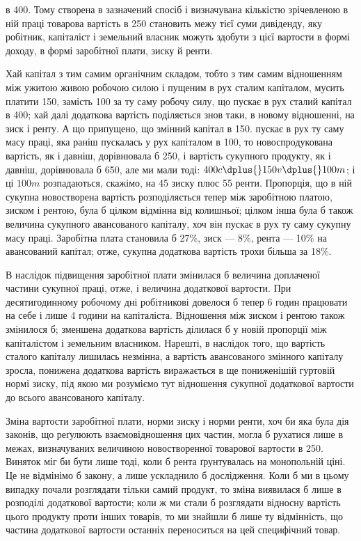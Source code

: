 \parcont{}  %
в 400. Тому створена в зазначений спосіб і визначувана кількістю зрічевленою
в ній праці товарова вартість в 250 становить межу тієї суми дивіденду,
яку робітник, капіталіст і земельний власник можуть здобути з цієї вартости
в формі доходу, в формі заробітної плати, зиску й ренти.

Хай капітал з тим самим органічним складом, тобто з тим самим відношенням
між ужитою живою робочою силою і пущеним в рух сталим капіталом,
мусить платити 150, замість 100 за ту саму робочу силу,
що пускає в рух сталий капітал в 400; хай далі додаткова вартість поділяється
знов таки, в новому відношенні, на зиск і ренту. А що припущено,
що змінний капітал в 150. пускає в рух ту саму масу праці,
яка раніш пускалась у рух капіталом в 100, то новоспродукована вартість, як
і давніш, дорівнювала б 250, і вартість сукупного продукту, як і давніш, дорівнювала
б 650, але ми мали тоді: $400c \dplus{} 150v \dplus{} 100m$; і ці $100m$ розпадаються,
скажімо, на 45 зиску плюс 55 ренти. Пропорція, що в ній сукупна новостворена
вартість розподіляється тепер між заробітною платою, зиском і рентою,
була б цілком відмінна від колишньої; цілком інша була б також величина
сукупного авансованого капіталу, хоч він пускає в рух ту саму сукупну масу
праці. Заробітна плата становила б 27\%, зиск — 8\%, рента — 10\% на
авансований капітал; отже, сукупна додаткова вартість трохи більша за 18\%.

В наслідок підвищення заробітної плати змінилася б величина доплаченої
частини сукупної праці, отже, і величина додаткової вартости. При десятигодинному
робочому дні робітникові довелося б тепер 6 годин працювати на
себе і лише 4 години на капіталіста. Відношення між зиском і рентою також
змінилося б; зменшена додаткова вартість ділилася б у новій пропорції між
капіталістом і земельним власником. Нарешті, в наслідок того, що вартість
сталого капіталу лишилась незмінна, а вартість авансованого змінного капіталу
зросла, понижена додаткова вартість виражається в ще пониженішій гуртовій
нормі зиску, під якою ми розуміємо тут відношення сукупної додаткової вартости
до всього авансованого капіталу.

Зміна вартости заробітної плати, норми зиску і норми ренти, хоч би яка
була дія законів, що реґулюють взаємовідношення цих частин, могла б рухатися
лише в межах, визначуваних величиною новостворенної товарової вартости
в 250. Виняток міг би бути лише тоді, коли б рента ґрунтувалась на
монопольній ціні. Це не відмінімо б закону, а лише ускладнило б дослідження.
Коли б ми в цьому випадку почали розглядати тільки самий продукт, то зміна
виявилася б лише в розподілі додаткової вартости; коли ж ми стали б розглядати
відносну вартість цього продукту проти інших товарів, то ми знайшли б
лише ту відмінність, що частина додаткової вартости останніх переноситься на
цей специфічний товар.

